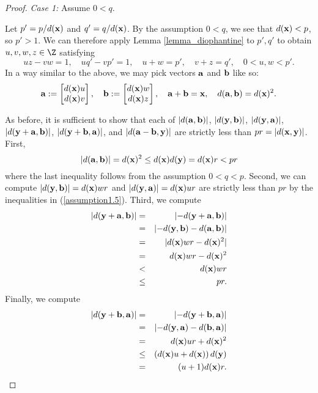 \begin{proof}
	\noindent \emph{Case 1:} Assume $0 < q$. 
	
	Let $p' = p / d({\mathbf{x}})$ and $q' = q / d({\mathbf{x}})$. By the assumption $0 < q$, we see that $d({\mathbf{x}}) < p$, so $p' > 1$. We can therefore apply Lemma \ref{lemma_diophantine} to $p',q'$ to obtain $u,v,w,z \in \Z$ satisfying 
	\begin{equation}\label{assumption1.5}
	uz - vw = 1,\quad uq' - vp' = 1,\quad u + w = p',\quad v + z = q',\quad 0 < u,w < p'.
	\end{equation}
	In a way similar to the above, we may pick vectors ${\mathbf{a}}$ and ${\mathbf{b}}$ like so: %
	\begin{equation}\label{assumption2}
	\aab := \begin{bmatrix}  d(\xx)u\\ d(\xx)v\end{bmatrix},\quad 
	\bb := \begin{bmatrix} d(\xx)w\\ d(\xx)z\end{bmatrix},
	\quad \aab + \bb = \xx,\quad d(\aab, \bb) = d(\xx)^2. %
	\end{equation}
	
	As before, it is sufficient to show that each of $\lvert d({\mathbf{a}}, {\mathbf{b}}) \rvert$, $\lvert d({\mathbf{y}},{\mathbf{b}}) \rvert$, $\lvert d({\mathbf{y}},{\mathbf{a}}) \rvert$, $\lvert d({\mathbf{y}}+{\mathbf{a}},{\mathbf{b}}) \rvert$, $\lvert d({\mathbf{y}}+{\mathbf{b}},{\mathbf{a}}) \rvert$, and $\lvert d({\mathbf{a}}-{\mathbf{b}},{\mathbf{y}}) \rvert$ are strictly less than $pr  = \lvert d({\mathbf{x}},{\mathbf{y}}) \rvert$. First,
	\[
	\lvert d({\mathbf{a}},{\mathbf{b}}) \rvert = d({\mathbf{x}})^2 \leq d({\mathbf{x}})d({\mathbf{y}}) = d({\mathbf{x}})r < pr
	\]
	where the last inequality follows from the assumption $0 < q < p$. Second, we can compute $\lvert d({\mathbf{y}},{\mathbf{b}}) \rvert = d({\mathbf{x}})w r $ and $ \lvert d({\mathbf{y}},{\mathbf{a}}) \rvert =  d({\mathbf{x}})u r $ are strictly less than $pr$ by the inequalities in (\ref{assumption1.5}). Third, we compute
	\begin{eqnarray*}
		\lvert d(\yy+\aab, \bb) \rvert &=& \lvert -d(\yy+\aab, \bb) \rvert \\
		&=& \lvert -d(\yy,\bb) - d(\aab, \bb) \rvert\\
		&=& \lvert d(\xx)wr - d(\xx)^2 \rvert \\
		&=& d(\xx)wr - d(\xx)^2 \\ %
		&<& d(\xx)wr\\
		&\leq& pr.
	\end{eqnarray*}
	Finally, we compute
	\begin{eqnarray*}
		\lvert d({\mathbf{y}}+{\mathbf{b}}, {\mathbf{a}}) \rvert &=& \lvert -d({\mathbf{y}}+{\mathbf{b}}, {\mathbf{a}}) \rvert \\
		&=& \lvert -d({\mathbf{y}},{\mathbf{a}}) - d({\mathbf{b}}, {\mathbf{a}}) \rvert \\
		&=& d({\mathbf{x}})ur + d({\mathbf{x}})^2 \\
		&\leq& \left(d({\mathbf{x}})u + d({\mathbf{x}})\right)d({\mathbf{y}})\\
		&=& (u+1)d({\mathbf{x}})r.
	\end{eqnarray*}
	

\end{proof}

